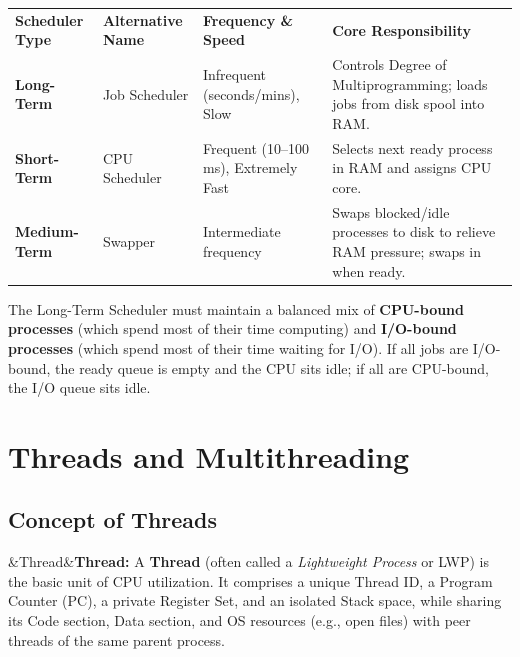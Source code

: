 \documentclass[11pt,a4paper]{article}
\newenvironment{Tip}[1][Key Takeaway]{\begin{tcolorbox}[tipbox, title={#1}]}{\end{tcolorbox}}
\newenvironment{Def}[1][]{\begin{tcolorbox}[defbox]\ifx&#1&\else\textbf{#1:}\enspace\fi}{\end{tcolorbox}}
\begin{document}
\begin{center}
\begin{tabularx}{\linewidth}{L{3.0cm} L{3.2cm} L{3.5cm} X}
  \color{white}\textbf{Scheduler Type} &
  \color{white}\textbf{Alternative Name} &
  \color{white}\textbf{Frequency \& Speed} &
  \color{white}\textbf{Core Responsibility} \\
  \textbf{Long-Term} & Job Scheduler & Infrequent (seconds/mins), Slow & Controls Degree of Multiprogramming; loads jobs from disk spool into RAM. \\
  \textbf{Short-Term} & CPU Scheduler & Frequent (10--100 ms), Extremely Fast & Selects next ready process in RAM and assigns CPU core. \\
  \textbf{Medium-Term} & Swapper & Intermediate frequency & Swaps blocked/idle processes to disk to relieve RAM pressure; swaps in when ready. \\
\end{tabularx}
\end{center}

\begin{Tip}[Job Mix Balance]
The Long-Term Scheduler must maintain a balanced mix of \textbf{CPU-bound processes} (which spend most of their time computing) and \textbf{I/O-bound processes} (which spend most of their time waiting for I/O). If all jobs are I/O-bound, the ready queue is empty and the CPU sits idle; if all are CPU-bound, the I/O queue sits idle.
\end{Tip}

\section{Threads and Multithreading}

\subsection{Concept of Threads}

\begin{Def}[Thread]
A \textbf{Thread} (often called a \emph{Lightweight Process} or LWP) is the basic unit of CPU utilization. It comprises a unique Thread ID, a Program Counter (PC), a private Register Set, and an isolated Stack space, while sharing its Code section, Data section, and OS resources (e.g., open files) with peer threads of the same parent process.
\end{Def}
\end{document}
